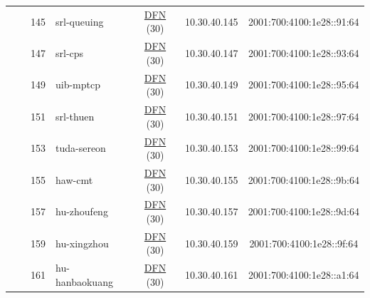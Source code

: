 \begin{small}
\begin{center}
\begin{longtable}{|c|c|c|c|c|c|c|c|}
  &  & \tiny{145} & \multicolumn{1}{|l|}{\tiny{srl-queuing}} & \multicolumn{2}{|c|}{\tiny{\href{https://www.dfn.de}{DFN} (30)}} & \tiny{10.30.40.145} & \tiny{2001:700:4100:1e28::91:64} \\* \cline{3-3}\cline{4-4}\cline{5-5}\cline{6-6}\cline{7-7}\cline{8-8}
  &  & \tiny{147} & \multicolumn{1}{|l|}{\tiny{srl-cps}} & \multicolumn{2}{|c|}{\tiny{\href{https://www.dfn.de}{DFN} (30)}} & \tiny{10.30.40.147} & \tiny{2001:700:4100:1e28::93:64} \\* \cline{3-3}\cline{4-4}\cline{5-5}\cline{6-6}\cline{7-7}\cline{8-8}
  &  & \tiny{149} & \multicolumn{1}{|l|}{\tiny{uib-mptcp}} & \multicolumn{2}{|c|}{\tiny{\href{https://www.dfn.de}{DFN} (30)}} & \tiny{10.30.40.149} & \tiny{2001:700:4100:1e28::95:64} \\* \cline{3-3}\cline{4-4}\cline{5-5}\cline{6-6}\cline{7-7}\cline{8-8}
  &  & \tiny{151} & \multicolumn{1}{|l|}{\tiny{srl-thuen}} & \multicolumn{2}{|c|}{\tiny{\href{https://www.dfn.de}{DFN} (30)}} & \tiny{10.30.40.151} & \tiny{2001:700:4100:1e28::97:64} \\* \cline{3-3}\cline{4-4}\cline{5-5}\cline{6-6}\cline{7-7}\cline{8-8}
  &  & \tiny{153} & \multicolumn{1}{|l|}{\tiny{tuda-sereon}} & \multicolumn{2}{|c|}{\tiny{\href{https://www.dfn.de}{DFN} (30)}} & \tiny{10.30.40.153} & \tiny{2001:700:4100:1e28::99:64} \\* \cline{3-3}\cline{4-4}\cline{5-5}\cline{6-6}\cline{7-7}\cline{8-8}
  &  & \tiny{155} & \multicolumn{1}{|l|}{\tiny{haw-cmt}} & \multicolumn{2}{|c|}{\tiny{\href{https://www.dfn.de}{DFN} (30)}} & \tiny{10.30.40.155} & \tiny{2001:700:4100:1e28::9b:64} \\* \cline{3-3}\cline{4-4}\cline{5-5}\cline{6-6}\cline{7-7}\cline{8-8}
  &  & \tiny{157} & \multicolumn{1}{|l|}{\tiny{hu-zhoufeng}} & \multicolumn{2}{|c|}{\tiny{\href{https://www.dfn.de}{DFN} (30)}} & \tiny{10.30.40.157} & \tiny{2001:700:4100:1e28::9d:64} \\* \cline{3-3}\cline{4-4}\cline{5-5}\cline{6-6}\cline{7-7}\cline{8-8}
  &  & \tiny{159} & \multicolumn{1}{|l|}{\tiny{hu-xingzhou}} & \multicolumn{2}{|c|}{\tiny{\href{https://www.dfn.de}{DFN} (30)}} & \tiny{10.30.40.159} & \tiny{2001:700:4100:1e28::9f:64} \\* \cline{3-3}\cline{4-4}\cline{5-5}\cline{6-6}\cline{7-7}\cline{8-8}
  &  & \tiny{161} & \multicolumn{1}{|l|}{\tiny{hu-hanbaokuang}} & \multicolumn{2}{|c|}{\tiny{\href{https://www.dfn.de}{DFN} (30)}} & \tiny{10.30.40.161} & \tiny{2001:700:4100:1e28::a1:64} \\* \cline{3-3}\cline{4-4}\cline{5-5}\cline{6-6}\cline{7-7}\cline{8-8}

\end{longtable}
\end{center}
\end{small}
